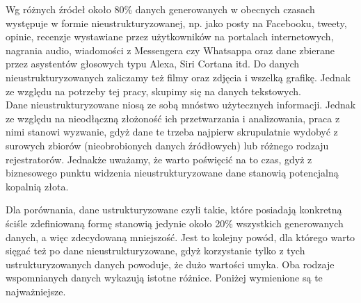


\noindent Wg różnych źródeł około 80\% danych generowanych w obecnych czasach występuje w formie nieustrukturyzowanej, np. jako posty na Facebooku, tweety, opinie, recenzje wystawiane przez użytkowników na portalach internetowych, nagrania audio, wiadomości z Messengera czy Whatsappa oraz dane zbierane przez asystentów głosowych typu Alexa, Siri Cortana itd.
Do danych nieustrukturyzowanych zaliczamy też filmy oraz zdjęcia i wszelką grafikę.
Jednak ze względu na potrzeby tej pracy, skupimy się na danych tekstowych. \\

\noindent Dane nieustrukturyzowane niosą ze sobą mnóstwo użytecznych informacji. Jednak ze względu na nieodłączną złożoność ich przetwarzania i analizowania, praca z nimi stanowi wyzwanie, gdyż dane te trzeba najpierw skrupulatnie wydobyć z surowych zbiorów (nieobrobionych danych źródłowych) lub różnego rodzaju rejestratorów. Jednakże uważamy, że warto poświęcić na to czas, gdyż z biznesowego punktu widzenia nieustrukturyzowane dane stanowią potencjalną kopalnią złota.

\noindent Dla porównania, dane ustrukturyzowane czyli takie, które posiadają konkretną ściśle zdefiniowaną formę stanowią jedynie około 20\% wszystkich generowanych danych, a więc zdecydowaną mniejszość. Jest to kolejny powód, dla którego warto sięgać też po dane nieustrukturyzowane, gdyż korzystanie tylko z tych ustrukturyzowanych danych powoduje, że dużo wartości umyka.
Oba rodzaje wspomnianych danych wykazują istotne różnice. Poniżej wymienione są te najważniejsze.

